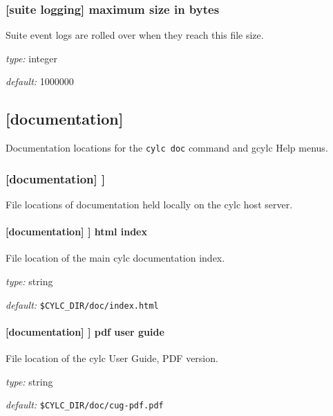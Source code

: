 \subsubsection[maximum size in bytes]{[suite logging] \textrightarrow maximum size in bytes}

Suite event logs are rolled over when they reach this file size.

\begin{myitemize}
\item {\em type:} integer
\item {\em default:} 1000000
\end{myitemize}

\subsection{[documentation]}

Documentation locations for the \lstinline=cylc doc= command and gcylc
Help menus.

\subsubsection[{[[}files{]]}]{[documentation] \textrightarrow [[files]]}

File locations of documentation held locally on the cylc host server.

\paragraph[html index]{[documentation] \textrightarrow [[files]] \textrightarrow html index }

File location of the main cylc documentation index.
\begin{myitemize}
\item {\em type:} string
\item {\em default:} \lstinline=$CYLC_DIR/doc/index.html=
\end{myitemize}

\paragraph[pdf user guide]{[documentation] \textrightarrow [[files]] \textrightarrow pdf user guide }

File location of the cylc User Guide, PDF version.
\begin{myitemize}
\item {\em type:} string
\item {\em default:} \lstinline=$CYLC_DIR/doc/cug-pdf.pdf=
\end{myitemize}


